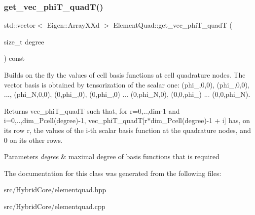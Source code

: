 \subsubsection{\texorpdfstring{get\+\_\+vec\+\_\+phi\+T\+\_\+quad\+T()}{get\_vec\_phiT\_quadT()}}
{\footnotesize\ttfamily std\+::vector$<$ Eigen\+::\+Array\+X\+Xd $>$ Element\+Quad\+::get\+\_\+vec\+\_\+phi\+T\+\_\+quadT (\begin{DoxyParamCaption}\item[{size\+\_\+t}]{degree }\end{DoxyParamCaption}) const}



Builds on the fly the values of cell basis functions at cell quadrature nodes. The vector basis is obtained by tensorization of the scalar one\+: (phi\+\_,0,0), (phi\+\_,0,0), ..., (phi\+\_\+N,0,0), (0,phi\+\_,0), (0,phi\+\_,0) ... (0,phi\+\_\+N,0), (0,0,phi\+\_) ... (0,0,phi\+\_\+N). 

\begin{DoxyReturn}{Returns}
vec\+\_\+phi\+T\+\_\+quadT such that, for r=0,..,dim-\/1 and i=0,..,dim\+\_\+\+Pcell(degree)-\/1, vec\+\_\+phi\+T\+\_\+quadT\mbox{[}r$\ast$dim\+\_\+\+Pcell(degree)-\/1 + i\mbox{]} has, on its row r, the values of the i-\/th scalar basis function at the quadrature nodes, and 0 on its other rows. 
\end{DoxyReturn}

\begin{DoxyParams}{Parameters}
{\em degree} & maximal degree of basis functions that is required \\
\hline
\end{DoxyParams}


The documentation for this class was generated from the following files\+:\begin{DoxyCompactItemize}
\item 
src/\+Hybrid\+Core/elementquad.\+hpp\item 
src/\+Hybrid\+Core/elementquad.\+cpp\end{DoxyCompactItemize}
